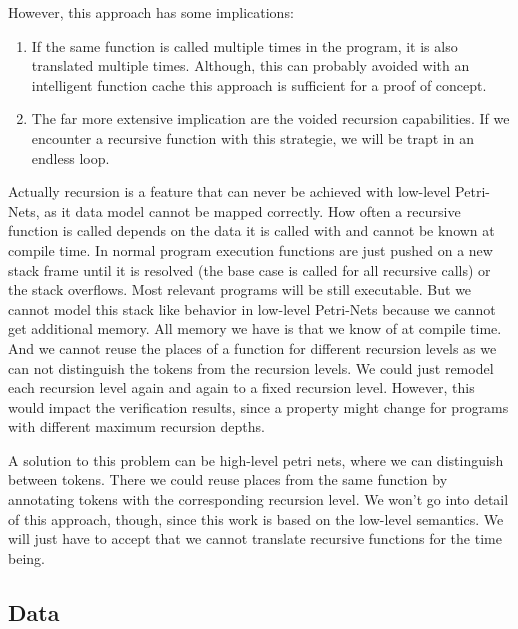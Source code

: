 However, this approach has some implications:
\begin{enumerate}
    \item If the same function is called multiple times in the program, it is also translated multiple times.
    Although, this can probably avoided with an intelligent function cache this approach is sufficient for a proof of concept.
    \item The far more extensive implication are the voided recursion capabilities.
    If we encounter a recursive function with this strategie, we will be trapt in an endless loop.
\end{enumerate}
Actually recursion is a feature that can never be achieved with low-level Petri-Nets, as it data model cannot be mapped correctly.
How often a recursive function is called depends on the data it is called with and cannot be known at compile time.
In normal program execution functions are just pushed on a new stack frame until it is resolved (the base case is called for all recursive calls) or the stack overflows.
Most relevant programs will be still executable.
But we cannot model this stack like behavior in low-level Petri-Nets because we cannot get additional memory.
All memory we have is that we know of at compile time.
And we cannot reuse the places of a function for different recursion levels as we can not distinguish the tokens from the recursion levels.
We could just remodel each recursion level again and again to a fixed recursion level.
However, this would impact the verification results, since a property might change for programs with different maximum recursion depths.

A solution to this problem can be high-level petri nets, where we can distinguish between tokens.
There we could reuse places from the same function by annotating tokens with the corresponding recursion level.
We won't go into detail of this approach, though, since this work is based on the low-level semantics.
We will just have to accept that we cannot translate recursive functions for the time being.

\subsection{Data}

